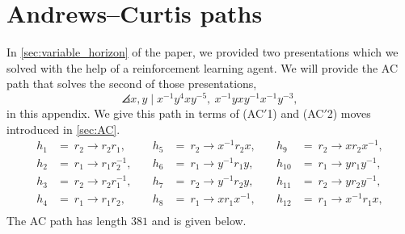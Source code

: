 
\section{Andrews--Curtis paths} \label{app:paths}
In \autoref{sec:variable_horizon} of the paper, we provided two presentations which we solved with the help of a reinforcement learning agent. We will provide the AC path that solves the second of those presentations, 
\[
\angles{x, y \mid x^{-1} y^4 x y^{-5} , \ x^{-1} y x y^{-1} x^{-1} y^{-3}},
\]
in this appendix. We give this path in terms of (AC$'$1) and (AC$'$2) moves introduced in \autoref{sec:AC}. 
\[
\begin{aligned}
h_1 &= \ r_2 \rightarrow r_2 r_1, & \quad h_5 &= \ r_2 \rightarrow x^{-1} r_2 x, & \quad h_9 &= \ r_2 \rightarrow x r_2 x^{-1}, \\
h_2 &= \ r_1 \rightarrow r_1 r_2^{-1}, & \quad h_6 &= \ r_1 \rightarrow y^{-1} r_1 y, & \quad h_{10} &= \ r_1 \rightarrow y r_1 y^{-1}, \\
h_3 &= \ r_2 \rightarrow r_2 r_1^{-1}, & \quad h_7 &= \ r_2 \rightarrow y^{-1} r_2 y, & \quad h_{11} &= \ r_2 \rightarrow y r_2 y^{-1}, \\
h_4 &= \ r_1 \rightarrow r_1 r_2, & \quad h_8 &= \ r_1 \rightarrow x r_1 x^{-1}, & \quad h_{12} &= \ r_1 \rightarrow x^{-1} r_1 x, \\
\end{aligned}
\]
The AC path has length $381$ and is given below.
